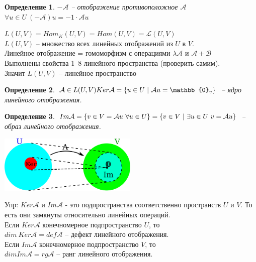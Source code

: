 \documentclass[12pt]{article}
\newtheorem{defin}{Определение}[subsection]
\theoremstyle{remark}
\theoremstyle{definition}
\newcommand{\0}{\mathbb{0}}
\newcommand{\mybox}{
	\collectbox{
		\setlength{\fboxsep}{1pt}
		\fbox{\BOXCONTENT}
	}
}
\newcommand{\A}{\mathcal{A}}
\newcommand{\B}{\mathcal{B}}
\begin{document}
	\begin{defin}
		$-\A$ -- отображение противоположное $\A$\\
		$\forall u \in U \ (-\A)u = -1 \cdot \A u$
	\end{defin}
	
	$L(U, V) = Hom_K(U, V) = Hom(U, V) = \mathcal{L}(U, V)$\\
	$L(U, V)$ -- множество всех линейных отображений из $U$ в $V$.\\
	Линейное отображение = гомоморфизм с операциями $\lambda \A$ и $\A + \B$\\
	Выполнены свойства 1--8 линейного пространства (проверить самим). \\Значит \mybox{$L(U, V)$ -- линейное пространство}
	\begin{defin}
		$\A \in L(U, V)\\
		Ker\A = \{u \in U \ | \ \A u = \0_v\}$ -- ядро линейного отображения. 
	\end{defin}
	\begin{defin}
		$Im\A =\{v \in V = \A u \ \forall u \in U\} = \\ \{v \in V \ | \  \exists u \in U \ v = \A u\}$ --
		образ линейного отображения.
	\end{defin}
	\includegraphics[width=250px]{1}
	
	Упр: $Ker\A$ и $Im\A$ - это подпространства соответственно пространств $U$ и $V$. То есть они замкнуты относительно линейных операций. \\
	Если $Ker\A$ конечномерное подпространство $U$, то \\
	\mybox{$dim \ Ker\A = def\A$} -- дефект линейного отображения.\\
	Если $Im\A$ конечномерное подпространство $V$, то \\
	\mybox{$dimIm\A = rg\A$} -- ранг линейного отображения.
	
\end{document}
